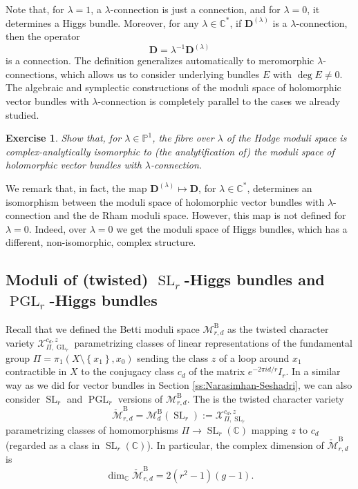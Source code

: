 \documentclass[12pt,a4paper]{amsbook}
\theoremstyle{remark} \newtheorem{rmk}[thm]{Remark}
\theoremstyle{definition} \newtheorem{defn}[thm]{Definition}
\theoremstyle{definition} \newtheorem{ex}[thm]{Example}
\theoremstyle{definition} \newtheorem{ej}{Exercise}
\let\emph\relax
\newcommand{\C}{\mathbb C}
\newcommand{\bbP}{\mathbb P}
\newcommand{\cM}{\mathcal M}
\newcommand{\cX}{\mathcal X}
\newcommand{\Bt}{\mathrm{B}}
\DeclareMathOperator{\GL}{GL}
\DeclareMathOperator{\SL}{SL}
\DeclareMathOperator{\PGL}{PGL}
\begin{document}
Note that, for $\lambda=1$, a $\lambda$-connection is just a connection, and for $\lambda=0$, it determines a Higgs bundle. Moreover, for any $\lambda \in \C^*$, if $\bm{D}^{(\lambda)}$ is a $\lambda$-connection, then the operator
\begin{equation*}
\bm{D} = \lambda^{-1} \bm{D}^{(\lambda)}
\end{equation*}
is a connection.
The definition generalizes automatically to meromorphic $\lambda$-connections, which allows us to consider underlying bundles $E$ with $\deg E\neq 0$.  The algebraic and symplectic constructions of the moduli space of holomorphic vector bundles with $\lambda$-connection is completely parallel to the cases we already studied.

\begin{ej}
\textit{Show that, for $\lambda\in \bbP^1$, the fibre over $\lambda$ of the Hodge moduli space is complex-analytically isomorphic to (the analytification of) the moduli space of holomorphic vector bundles with $\lambda$-connection.}
\end{ej}

We remark that, in fact, the map $\bm{D}^{(\lambda)}\mapsto \bm{D}$, for $\lambda \in \C^*$, determines an isomorphism between the moduli space of holomorphic vector bundles with $\lambda$-connection and the de Rham moduli space. However, this map is not defined for $\lambda=0$. Indeed, over $\lambda=0$ we get the moduli space of Higgs bundles, which has a different, non-isomorphic, complex structure.

\subsection*{Moduli of (twisted) $\SL_r$-Higgs bundles and $\PGL_r$-Higgs bundles}
Recall that we defined the Betti moduli space $\cM^{\Bt}_{r,d}$ as the twisted character variety $\cX_{\Pi,\GL_r}^{c_d,z}$ parametrizing classes of linear representations of the fundamental group $\Pi=\pi_1(X\setminus \left\{ x_1 \right\},x_0)$ sending the class $z$ of a loop around $x_1$ contractible in $X$ to the conjugacy class $c_d$ of the matrix $e^{-2\pi i d/r}I_r$. In a similar way as we did for vector bundles in Section \ref{ss:Narasimhan-Seshadri}, we can also consider $\SL_r$ and $\PGL_r$ versions of $\cM^{\Bt}_{r,d}$. The \emph{$d$-twisted $\SL_r$-Betti moduli space} is the twisted character variety
\begin{equation*}
\check{\cM}^{\Bt}_{r,d} = \cM^{\Bt}_d(\SL_r) := \cX_{\Pi,\SL_r}^{c_d,z}
\end{equation*}
parametrizing classes of homomorphisms $\Pi\rightarrow \SL_r(\C)$ mapping $z$ to $c_d$ (regarded as a class in $\SL_r(\C)$). In particular, the complex dimension of $\check{\cM}^{\Bt}_{r,d}$ is
\begin{equation*}
\dim_{\C}\check{\cM}^{\Bt}_{r,d} = 2(r^2-1)(g-1).
\end{equation*}
\end{document}
